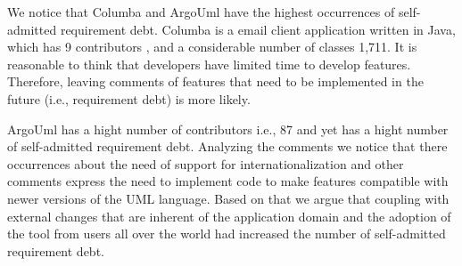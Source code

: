 We notice that Columba and ArgoUml have the highest occurrences of self-admitted requirement debt. Columba is a email client application written in Java, which has 9 contributors \cite{Openhub:home}, and a considerable number of classes 1,711. It is reasonable to think that developers have limited time to develop features. Therefore, leaving comments of features that need to be implemented in the future (i.e., requirement debt) is more likely. 

ArgoUml has a hight number of contributors i.e., 87 and yet has a hight number of self-admitted requirement debt. Analyzing the comments we notice that there occurrences about the need of support for internationalization and other comments express the need to implement code to make features compatible with newer versions of the UML language. Based on that we argue that coupling with external changes that are inherent of the application domain and the adoption of the tool from users all over the world \cite{Openhub:home} had increased the number of self-admitted requirement debt. 

